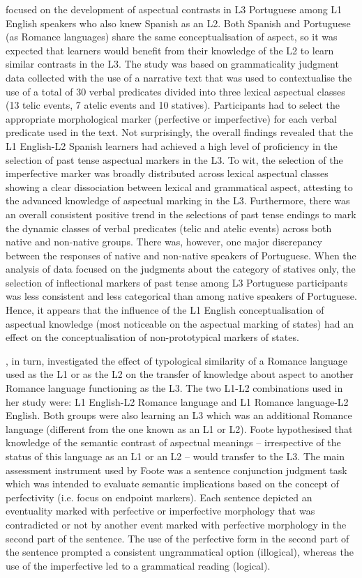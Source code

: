 \documentclass[output=paper,modfonts,nonflat,newtxmath]{langsci/langscibook}
\begin{document}
\citet{Salaberry2005} focused on the development of aspectual contrasts in L3 Portuguese among L1 English speakers who also knew Spanish as an L2. Both Spanish and Portuguese (as Romance languages) share the same conceptualisation of aspect, so it was expected that learners would benefit from their knowledge of the L2 to learn similar contrasts in the L3. The study was based on grammaticality judgment data collected with the use of a narrative text that was used to contextualise the use of a total of 30 verbal predicates divided into three lexical aspectual classes (13 telic events, 7 atelic events and 10 statives). Participants had to select the appropriate morphological marker (perfective or imperfective) for each verbal predicate used in the text. Not surprisingly, the overall findings revealed that the L1 English-L2 Spanish learners had achieved a high level of proficiency in the selection of past tense aspectual markers in the L3. To wit, the selection of the imperfective marker was broadly distributed across lexical aspectual classes showing a clear dissociation between lexical and grammatical aspect, attesting to the advanced knowledge of aspectual marking in the L3. Furthermore, there was an overall consistent positive trend in the selections of past tense endings to mark the dynamic classes of verbal predicates (telic and atelic events) across both native and non-native groups. There was, however, one major discrepancy between the responses of native and non-native speakers of Portuguese. When the analysis of data focused on the judgments about the category of statives only, the selection of inflectional markers of past tense among L3 Portuguese participants was less consistent and less categorical than among native speakers of Portuguese. Hence, it appears that the influence of the L1 English conceptualisation of aspectual knowledge (most noticeable on the aspectual marking of states) had an effect on the conceptualisation of non-prototypical markers of states.

\citet{Foote2009}, in turn, investigated the effect of typological similarity of a Romance language used as the L1 or as the L2 on the transfer of knowledge about aspect to another Romance language functioning as the L3. The two L1-L2 combinations used in her study were: L1 English-L2 Romance language and L1 Romance language-L2 English. Both groups were also learning an L3 which was an additional Romance language (different from the one known as an L1 or L2). Foote hypothesised that knowledge of the semantic contrast of aspectual meanings – irrespective of the status of this language as an L1 or an L2 – would transfer to the L3. The main assessment instrument used by Foote was a sentence conjunction judgment task which was intended to evaluate semantic implications based on the concept of perfectivity (i.e. focus on endpoint markers). Each sentence depicted an eventuality marked with perfective or imperfective morphology that was contradicted or not by another event marked with perfective morphology in the second part of the sentence. The use of the perfective form in the second part of the sentence prompted a consistent ungrammatical option (illogical), whereas the use of the imperfective led to a grammatical reading (logical).
\end{document}
